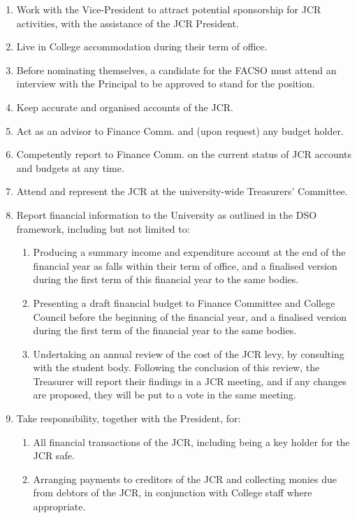 \begin{enumerate}
    \item Work with the Vice-President to attract potential sponsorship for JCR activities, with the assistance of the JCR President.
    \item Live in College accommodation during their term of office.
    \item Before nominating themselves, a candidate for the FACSO must attend an interview with the Principal to be approved to stand for the position.
    \item Keep accurate and organised accounts of the JCR. 
    \item Act as an advisor to Finance Comm. and (upon request) any budget holder. 
    \item Competently report to Finance Comm. on the current status of JCR accounts and budgets at any time. 
    \item Attend and represent the JCR at the university-wide Treasurers’ Committee. 
    \item Report financial information to the University as outlined in the DSO framework, including but not limited to: 
        \begin{enumerate}
            \item Producing a summary income and expenditure account at the end of the financial year as falls within their term of office, and a finalised version during the first term of this financial year to the same bodies. 
            \item Presenting a draft financial budget to Finance Committee and College Council before the beginning of the financial year, and a finalised version during the first term of the financial year to the same bodies. 
            \item Undertaking an annual review of the cost of the JCR levy, by consulting with the student body. Following the conclusion of this review, the Treasurer will report their findings in a JCR meeting, and if any changes are proposed, they will be put to a vote in the same meeting. 
        \end{enumerate}
    \item Take responsibility, together with the President, for:
        \begin{enumerate}
            \item All financial transactions of the JCR, including being a key holder for the JCR safe. 
            \item Arranging payments to creditors of the JCR and collecting monies due from debtors of the JCR, in conjunction with College staff where appropriate.

\end{enumerate}
\end{enumerate}
